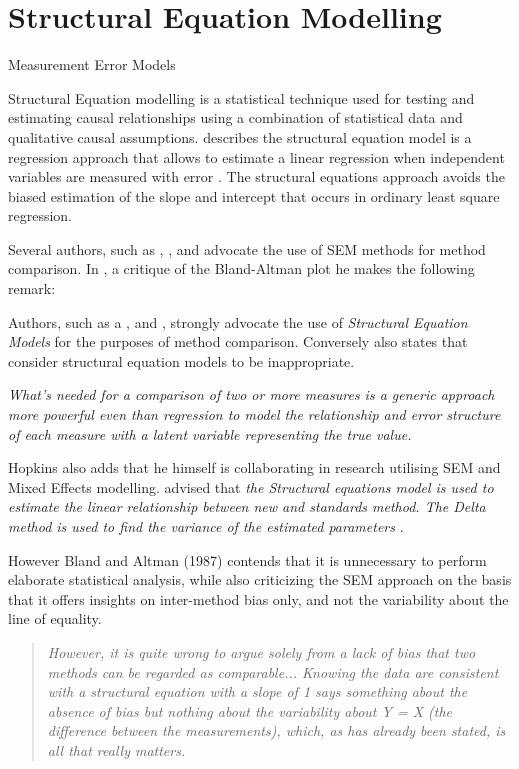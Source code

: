 \documentclass[12pt, a4paper]{report}
\theoremstyle{plain}
\theoremstyle{definition}
\theoremstyle{remark}
\begin{document}
\section{Structural Equation Modelling}
\citet{nawarathna2015} Measurement Error Models



Structural Equation modelling is a statistical technique used for testing and estimating causal relationships using a combination of statistical data and qualitative causal assumptions. \citet{carrasco2004} describes the structural equation model is a regression approach that allows to estimate a linear 
regression when independent variables are measured with error .
The structural equations approach avoids the biased estimation of the slope and intercept that occurs in ordinary least square regression.


 Several authors, such as \citet{Lewis}, \citet{gkelly1985},\citet{voelkel2005} and \citet{hopkins2004bias} advocate the use of SEM methods for method comparison. In \citet{hopkins2004bias}, a critique of the Bland-Altman plot he makes the following remark:

Authors, such as a \citet{lewis}, \citet{dunnSEME} and \citet{voelkel2005}, strongly advocate the use of \textit{Structural Equation Models} for the purposes of method comparison. Conversely \citet{BA99} also states that consider structural equation models to be inappropriate.

\emph{What's needed for a comparison of two or more measures is a
	generic approach more powerful even than regression to model the
	relationship and error structure of each measure with a latent
	variable representing the true value.}

Hopkins also adds that he himself is collaborating in research utilising SEM and Mixed Effects modelling. \citet{gkelly1985} advised that \textit{the Structural equations model is used to estimate the linear relationship between new and standards method.
The Delta method is used to find the variance of the estimated parameters} \citep{gkelly1985}.


However Bland and Altman (1987) contends that it is unnecessary to perform elaborate statistical analysis, while also criticizing the SEM approach on the basis that it offers insights  on inter-method bias only, and not the variability about the line of equality. 
\begin{quote}
\textit{	However, it is quite wrong to argue solely from a lack of bias that two methods can be regarded as comparable...
Knowing the data are consistent with a structural equation with a slope of 1 says something 
about the absence of bias but nothing about the variability about Y = X (the difference between the measurements), which, as has already been stated, is all that really matters.}
\end{quote}
\end{document}
